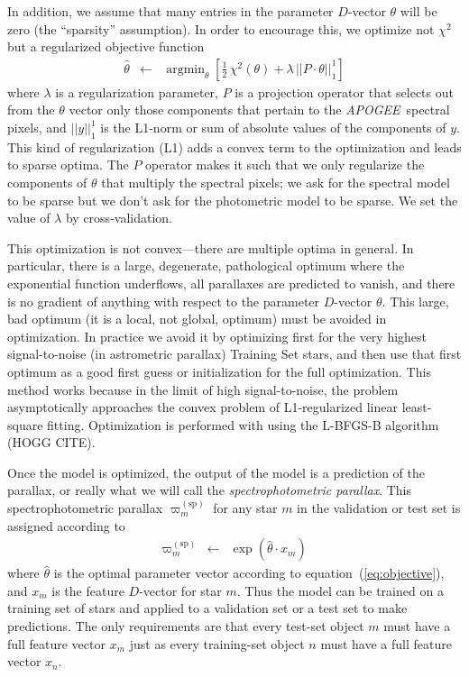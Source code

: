 \documentclass[modern]{aastex62}
\newcommand{\equationname}{equation}
\newcommand{\code}[1]{\texttt{\detokenize{#1}}}
\newcommand{\acronym}[1]{{\small{#1}}}
\newcommand{\project}[1]{\textsl{#1}}
\newcommand{\apogee}{\project{\acronym{APOGEE}}}
\DeclareMathOperator*{\argmin}{argmin}
\newcommand{\sparallax}{\varpi^{(\mathrm{sp})}}
\begin{document}
In addition, we assume that many entries in the parameter $D$-vector $\theta$ will be zero
(the ``sparsity'' assumption).
In order to encourage this, we optimize not $\chi^2$ but a regularized objective function
\begin{eqnarray}
\hat{\theta} &\leftarrow& \argmin_{\theta}\left[\frac{1}{2}\,\chi^2(\theta) + \lambda\,||P\cdot\theta||_1^1\right]
\label{eq:objective}
\end{eqnarray}
where
$\lambda$ is a regularization parameter,
$P$ is a projection operator that selects out from the $\theta$ vector only those components
that pertain to the \apogee\ spectral pixels,
and $||y||_1^1$ is the L1-norm or sum of absolute values of the components of $y$.
This kind of regularization (L1) adds a convex term to the optimization and leads to
sparse optima.
The $P$ operator makes it such that we only regularize the components of $\theta$ that multiply
the spectral pixels; we ask for the spectral model to be sparse but we don't ask for the photometric
model to be sparse.
We set the value of $\lambda$ by cross-validation.

This optimization is not convex---there are multiple optima in general.
In particular, there is a large, degenerate, pathological optimum where
the exponential function underflows, all parallaxes are predicted to vanish,
and there is no gradient of anything with respect to the parameter $D$-vector $\theta$.
This large, bad optimum (it is a local, not global, optimum) must be avoided in optimization.
In practice we avoid it by optimizing first for the very highest signal-to-noise
(in astrometric parallax) Training Set stars, and then use that first optimum as a
good first guess or initialization for the full optimization.
This method works because in the limit of high signal-to-noise, the problem asymptotically approaches
the convex problem of L1-regularized linear least-square fitting.
Optimization is performed with \code{scipy.optimize} using the
\acronym{L-BFGS-B} algorithm (HOGG CITE).

Once the model is optimized, the output of the model is a prediction of the parallax,
or really what we will call the \emph{spectrophotometric parallax}.
This spectrophotometric parallax
$\sparallax_m$ for any star $m$ in the validation or test set is
assigned according to
\begin{eqnarray}
\sparallax_m &\leftarrow& \exp(\hat{\theta}\cdot x_m)
\end{eqnarray}
where
$\hat{\theta}$ is the optimal parameter vector according
to \equationname~(\ref{eq:objective}),
and
$x_m$ is the feature $D$-vector for star $m$.
Thus the model can be trained on a training set of stars and applied to
a validation set or a test set to make predictions.
The only requirements are that every test-set object $m$  must have a full feature
vector $x_m$ just as every training-set object $n$ must have a full feature
vector $x_n$.
\end{document}
